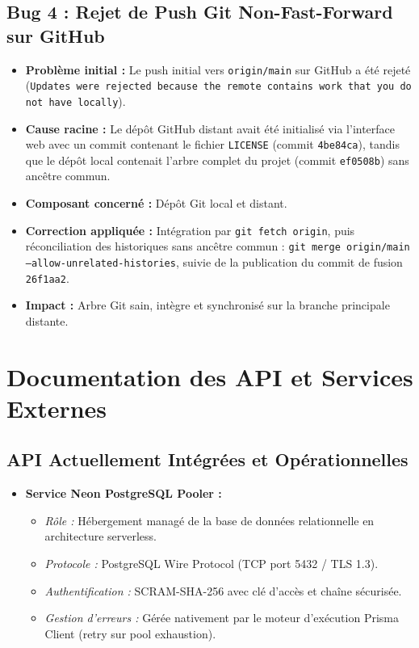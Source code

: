 \documentclass[11pt,a4paper]{article}
\begin{document}
\subsection{Bug 4 : Rejet de Push Git Non-Fast-Forward sur GitHub}
\begin{itemize}
    \item \textbf{Problème initial :} Le push initial vers \texttt{origin/main} sur GitHub a été rejeté (\texttt{Updates were rejected because the remote contains work that you do not have locally}).
    \item \textbf{Cause racine :} Le dépôt GitHub distant avait été initialisé via l'interface web avec un commit contenant le fichier \texttt{LICENSE} (commit \texttt{4be84ca}), tandis que le dépôt local contenait l'arbre complet du projet (commit \texttt{ef0508b}) sans ancêtre commun.
    \item \textbf{Composant concerné :} Dépôt Git local et distant.
    \item \textbf{Correction appliquée :} Intégration par \texttt{git fetch origin}, puis réconciliation des historiques sans ancêtre commun :
    \texttt{git merge origin/main --allow-unrelated-histories}, suivie de la publication du commit de fusion \texttt{26f1aa2}.
    \item \textbf{Impact :} Arbre Git sain, intègre et synchronisé sur la branche principale distante.
\end{itemize}

\section{Documentation des API et Services Externes}

\subsection{API Actuellement Intégrées et Opérationnelles}
\begin{itemize}
    \item \textbf{Service Neon PostgreSQL Pooler :}
    \begin{itemize}
        \item \emph{Rôle :} Hébergement managé de la base de données relationnelle en architecture serverless.
        \item \emph{Protocole :} PostgreSQL Wire Protocol (TCP port 5432 / TLS 1.3).
        \item \emph{Authentification :} SCRAM-SHA-256 avec clé d'accès et chaîne sécurisée.
        \item \emph{Gestion d'erreurs :} Gérée nativement par le moteur d'exécution Prisma Client (retry sur pool exhaustion).
    \end{itemize}
\end{itemize}
\end{document}

